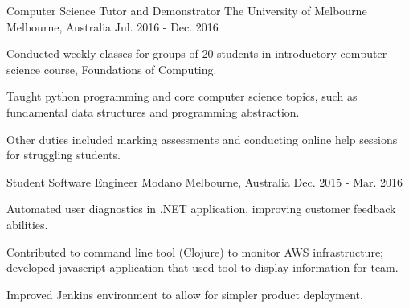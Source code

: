 \begin{cventries}
  \cventry
    {Computer Science Tutor and Demonstrator}
    {The University of Melbourne}
    {Melbourne, Australia}
    {Jul. 2016 - Dec. 2016}
    {
      \begin{cvitems}
        \item {Conducted weekly classes for groups of 20 students in introductory computer science course, Foundations of Computing.}
        \item {Taught python programming and core computer science topics, such as fundamental data structures and programming abstraction.}
        \item {Other duties included marking assessments and conducting online help sessions for struggling students.}
      \end{cvitems}
    }
  \cventry
    {Student Software Engineer}
    {Modano}
    {Melbourne, Australia}
    {Dec. 2015 - Mar. 2016}
    {
      \begin{cvitems}
        \item{Automated user diagnostics in .NET application, improving customer feedback abilities.}
        \item{Contributed to command line tool (Clojure) to monitor AWS infrastructure; developed javascript application that used tool to display information for team.}
        \item{Improved Jenkins environment to allow for simpler product deployment.}
      \end{cvitems}
    }
\end{cventries}
\vspace{-5mm}
